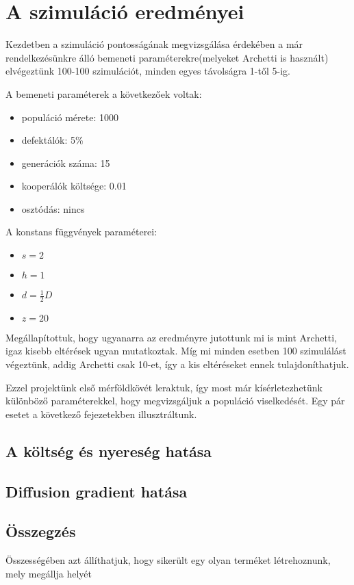 \section{A szimuláció eredményei}

Kezdetben a szimuláció pontosságának megvizsgálása érdekében a már rendelkezésünkre álló bemeneti paraméterekre(melyeket Archetti is használt\cite{archetti2013evolutionary}) elvégeztünk 100-100 szimulációt, minden egyes távolságra 1-től 5-ig.

\begin{multicols}{2}
	A bemeneti paraméterek a következőek voltak:
	\begin{itemize}[noitemsep]
		\item populáció mérete: 1000
		\item defektálók: 5\%
		\item generációk száma: 15
		\item kooperálók költsége: 0.01
		\item osztódás: nincs
	\end{itemize}
	A konstans függvények paraméterei:
	\begin{itemize}[noitemsep]
		\item $s = 2$
		\item $h = 1$
		\item $d = \frac{1}{2}D$
		\item $z = 20$
	\end{itemize}	
\end{multicols}

Megállapítottuk, hogy ugyanarra az eredményre jutottunk mi is mint Archetti\cite{archetti2013evolutionary}, igaz kisebb eltérések ugyan mutatkoztak. Míg mi minden esetben 100 szimulálást végeztünk, addig Archetti csak 10-et, így a kis eltéréseket ennek tulajdoníthatjuk.

Ezzel projektünk első mérföldkövét leraktuk, így most már kísérletezhetünk különböző paraméterekkel, hogy megvizsgáljuk a populáció viselkedését. Egy pár esetet a következő fejezetekben illusztráltunk.

\subsection{A költség és nyereség hatása}
\subsection{Diffusion gradient hatása}
\subsection{Összegzés}

Összességében azt állíthatjuk, hogy sikerült egy olyan terméket létrehoznunk, mely megállja helyét

